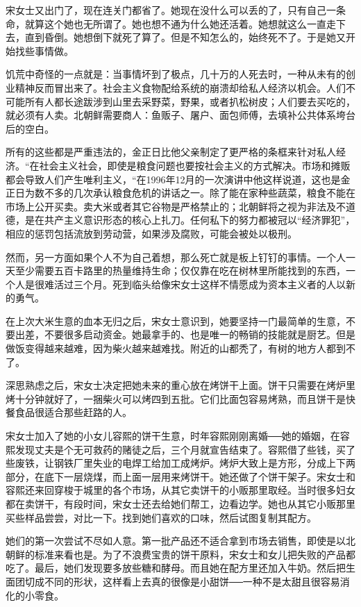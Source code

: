 宋女士又出门了，现在连关门都省了。她现在没什么可以丢的了，只有自己一条命，就算这个她也无所谓了。她也想不通为什么她还活着。她想就这么一直走下去，直到昏倒。她想倒下就死了算了。但是不知怎么的，始终死不了。于是她又开始找些事情做。

饥荒中奇怪的一点就是：当事情坏到了极点，几十万的人死去时，一种从未有的创业精神反而冒出来了。社会主义食物配给系统的崩溃却给私人经济以机会。人们不可能所有人都长途跋涉到山里去采野菜，野果，或者扒松树皮；人们要去买吃的，就必须有人卖。北朝鲜需要商人：鱼贩子、屠户、面包师傅，去填补公共体系垮台后的空白。

所有的这些都是严重违法的，金正日比他父亲制定了更严格的条框来针对私人经济。“在社会主义社会，即使是粮食问题也要按社会主义的方式解决。市场和摊贩都会导致人们产生唯利主义，“在1996年12月的一次演讲中他这样说道，这也是金正日为数不多的几次承认粮食危机的讲话之一。除了能在家种些蔬菜，粮食不能在市场上公开买卖。卖大米或者其它谷物是严格禁止的；北朝鲜将之视为非法及不道德，是在共产主义意识形态的核心上扎刀。任何私下的努力都被冠以“经济罪犯”，相应的惩罚包括流放到劳动营，如果涉及腐败，可能会被处以极刑。

然而，另一方面如果个人不为自己着想，那么死亡就是板上钉钉的事情。一个人一天至少需要五百卡路里的热量维持生命；仅仅靠在吃在树林里所能找到的东西，一个人是很难活过三个月。死到临头给像宋女士这样不情愿成为资本主义者的人以新的勇气。

在上次大米生意的血本无归之后，宋女士意识到，她要坚持一门最简单的生意，不要出差，不要很多启动资金。她最拿手的、也是唯一的畅销的技能就是厨艺。但是做饭变得越来越难，因为柴火越来越难找。附近的山都秃了，有树的地方人都到不了。

深思熟虑之后，宋女士决定把她未来的重心放在烤饼干上面。饼干只需要在烤炉里烤十分钟就好了，一捆柴火可以烤四到五批。它们比面包容易烤熟，而且饼干是快餐食品很适合那些赶路的人。

宋女士加入了她的小女儿容熙的饼干生意，时年容熙刚刚离婚──她的婚姻，在容熙发现丈夫是个无可救药的赌徒之后，三个月就宣告结束了。容熙借了些钱，买了些废铁，让钢铁厂里失业的电焊工给加工成烤炉。烤炉大致上是方形，分成上下两部分，在底下一层烧煤，而上面一层用来烤饼干。她还做了个饼干架子。宋女士和容熙还来回穿梭于城里的各个市场，从其它卖饼干的小贩那里取经。当时很多妇女都在卖饼干，有段时间，宋女士还去给她们帮工，边看边学。她也从其它小贩那里买些样品尝尝，对比一下。找到她们喜欢的口味，然后试图复制其配方。

她们的第一次尝试不尽如人意。第一批产品还不适合拿到市场去销售，即使是以北朝鲜的标准来看也是。为了不浪费宝贵的饼干原料，宋女士和女儿把失败的产品都吃了。最后，她们发现要多放些糖和酵母。而且她在配方里还加入牛奶。然后把生面团切成不同的形状，这样看上去真的很像是小甜饼──一种不是太甜且很容易消化的小零食。

